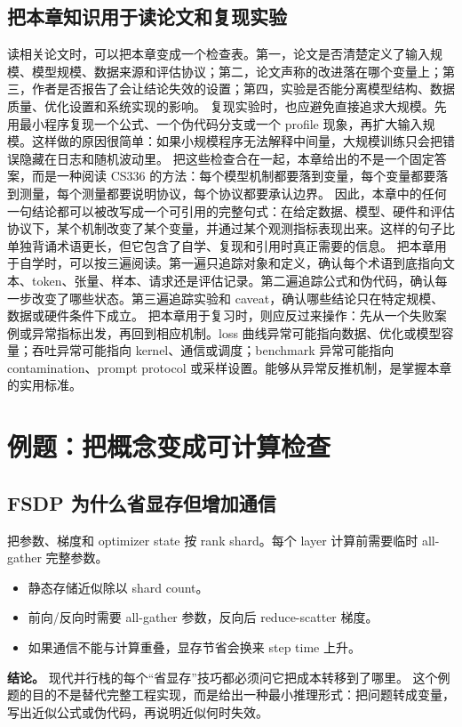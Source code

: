 \documentclass[a4paper]{article}
\begin{document}
\subsection{把本章知识用于读论文和复现实验}
读相关论文时，可以把本章变成一个检查表。第一，论文是否清楚定义了输入规模、模型规模、数据来源和评估协议；第二，论文声称的改进落在哪个变量上；第三，作者是否报告了会让结论失效的设置；第四，实验是否能分离模型结构、数据质量、优化设置和系统实现的影响。
复现实验时，也应避免直接追求大规模。先用最小程序复现一个公式、一个伪代码分支或一个 profile 现象，再扩大输入规模。这样做的原因很简单：如果小规模程序无法解释中间量，大规模训练只会把错误隐藏在日志和随机波动里。
把这些检查合在一起，本章给出的不是一个固定答案，而是一种阅读 CS336 的方法：每个模型机制都要落到变量，每个变量都要落到测量，每个测量都要说明协议，每个协议都要承认边界。
因此，本章中的任何一句结论都可以被改写成一个可引用的完整句式：在给定数据、模型、硬件和评估协议下，某个机制改变了某个变量，并通过某个观测指标表现出来。这样的句子比单独背诵术语更长，但它包含了自学、复现和引用时真正需要的信息。
把本章用于自学时，可以按三遍阅读。第一遍只追踪对象和定义，确认每个术语到底指向文本、token、张量、样本、请求还是评估记录。第二遍追踪公式和伪代码，确认每一步改变了哪些状态。第三遍追踪实验和 caveat，确认哪些结论只在特定规模、数据或硬件条件下成立。
把本章用于复习时，则应反过来操作：先从一个失败案例或异常指标出发，再回到相应机制。loss 曲线异常可能指向数据、优化或模型容量；吞吐异常可能指向 kernel、通信或调度；benchmark 异常可能指向 contamination、prompt protocol 或采样设置。能够从异常反推机制，是掌握本章的实用标准。
\section{例题：把概念变成可计算检查}
\subsection{FSDP 为什么省显存但增加通信}
把参数、梯度和 optimizer state 按 rank shard。每个 layer 计算前需要临时 all-gather 完整参数。
\begin{itemize}
\item 静态存储近似除以 shard count。
\item 前向/反向时需要 all-gather 参数，反向后 reduce-scatter 梯度。
\item 如果通信不能与计算重叠，显存节省会换来 step time 上升。
\end{itemize}
\textbf{结论。} 现代并行栈的每个“省显存”技巧都必须问它把成本转移到了哪里。
这个例题的目的不是替代完整工程实现，而是给出一种最小推理形式：把问题转成变量，写出近似公式或伪代码，再说明近似何时失效。
\end{document}
